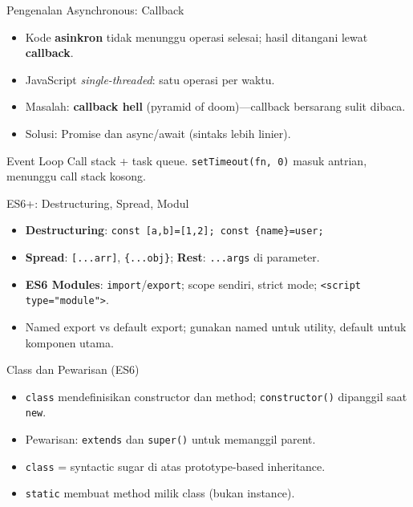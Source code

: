 \documentclass[handout]{beamer}
\begin{document}
\begin{frame}{Pengenalan Asynchronous: Callback}
	\begin{itemize}
		\item Kode \textbf{asinkron} tidak menunggu operasi selesai; hasil ditangani lewat \textbf{callback}.
		\item JavaScript \textit{single-threaded}: satu operasi per waktu.
		\item Masalah: \textbf{callback hell} (pyramid of doom)---callback bersarang sulit dibaca.
		\item Solusi: Promise dan async/await (sintaks lebih linier).
	\end{itemize}
	\begin{block}{Event Loop}
		Call stack + task queue. \texttt{setTimeout(fn, 0)} masuk antrian, menunggu call stack kosong.
	\end{block}
\end{frame}

\begin{frame}{ES6+: Destructuring, Spread, Modul}
	\begin{itemize}
		\item \textbf{Destructuring}: \texttt{const [a,b]=[1,2]; const \{name\}=user;}
		\item \textbf{Spread}: \texttt{[...arr]}, \texttt{\{...obj\}}; \textbf{Rest}: \texttt{...args} di parameter.
		\item \textbf{ES6 Modules}: \texttt{import}/\texttt{export}; scope sendiri, strict mode; \texttt{<script type="module">}.
		\item Named export vs default export; gunakan named untuk utility, default untuk komponen utama.
	\end{itemize}
\end{frame}

\begin{frame}{Class dan Pewarisan (ES6)}
	\begin{itemize}
		\item \texttt{class} mendefinisikan constructor dan method; \texttt{constructor()} dipanggil saat \texttt{new}.
		\item Pewarisan: \texttt{extends} dan \texttt{super()} untuk memanggil parent.
		\item \texttt{class} = syntactic sugar di atas prototype-based inheritance.
		\item \texttt{static} membuat method milik class (bukan instance).
	\end{itemize}
\end{frame}
\end{document}

